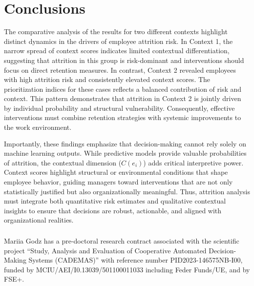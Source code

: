\documentclass[runningheads]{llncs}
\begin{document}
\section{Conclusions}

The comparative analysis of the results for two different contexts highlight distinct dynamics in the drivers of employee attrition risk. In Context 1, the narrow spread of context scores indicates limited contextual differentiation, suggesting that attrition in this group is risk-dominant and interventions should focus on direct retention measures.
In contrast, Context 2 revealed employees with high attrition risk and consistently elevated context scores. The prioritization indices for these cases reflects a balanced contribution of risk and context. This pattern demonstrates that attrition in Context 2 is jointly driven by individual probability and structural vulnerability. Consequently, effective interventions must combine retention strategies with systemic improvements to the work environment.

Importantly, these findings emphasize that decision-making cannot rely solely on machine learning outputs. While predictive models provide valuable probabilities of attrition, the contextual dimension ($C(e_i)$) adds critical interpretive power. Context scores highlight structural or environmental conditions that shape employee behavior, guiding managers toward interventions that are not only statistically justified but also organizationally meaningful. Thus, attrition analysis must integrate both quantitative risk estimates and qualitative contextual insights to ensure that decisions are robust, actionable, and aligned with organizational realities.

\begin{credits}
\subsubsection*{\ackname} Mariia Godz has a pre-doctoral research contract associated with the scientific project “Study, Analysis and Evaluation of Cooperative Automated Decision-Making Systems (CADEMAS)” with reference number PID2023-146575NB-I00, funded by MCIU/AEI/I0.13039/501100011033  including Feder Funds/UE, and by FSE+.

\end{credits}
\end{document}
